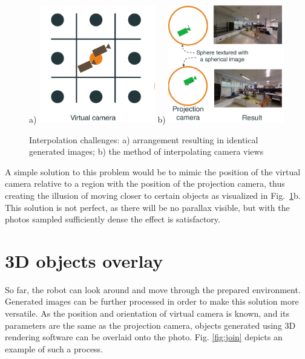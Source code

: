 \documentclass{svproc}
\begin{document}
\begin{figure}[!ht]
    \centering
    a) \includegraphics[width=0.45\textwidth]{img/interpolation/virt.pdf}
    b) \includegraphics[width=0.45\textwidth]{img/interpolation/proj.pdf}
    \caption{Interpolation challenges: a) arrangement resulting in identical generated images; b) the method of interpolating camera views}
    \label{fig:interpolation}
\end{figure}

A simple solution to this problem would be to mimic the position of the virtual camera relative 
to a region with the position of the projection camera, thus creating the illusion of moving closer 
to certain objects as visualized in Fig.~\ref{fig:interpolation}b. This solution is not perfect,
as there will be no parallax visible, but with the photos sampled sufficiently dense the effect is satisfactory.

\section{3D objects overlay}
\label{sec:gazebo}

So far, the robot can look around and move through the prepared environment. 
Generated images can be further processed in order to make this solution more versatile.
As the position and orientation of virtual camera is known, and its parameters are the same
as the projection camera, objects generated using 3D rendering software can be overlaid onto the photo.
Fig. \ref{fig:join} depicts an example of such a process.
\end{document}
